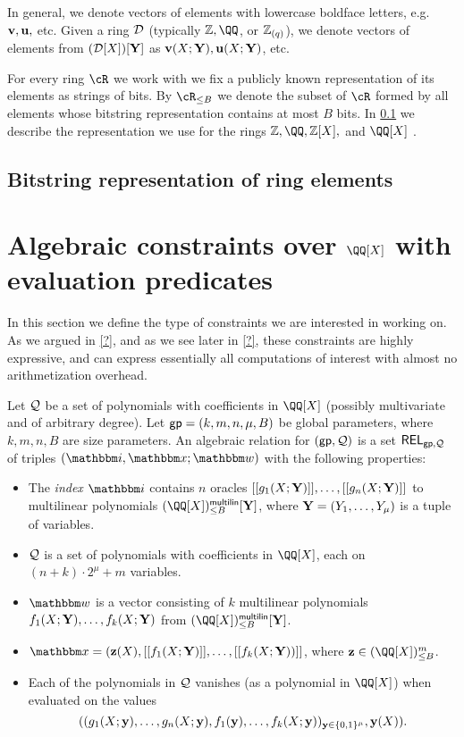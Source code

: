 \documentclass[11pt,letterpaper,usenames,dvipsnames]{article}
\begin{document}
In general, we denote vectors of elements with lowercase boldface letters, e.g.\ $\mathbf{v},\mathbf{u},$ etc. Given a ring $\mathcal{D}$ (typically $\ZZ, \QQ$, or $\mathbb{Z}_{(q)}$), we denote vectors of elements from $(\mathcal{D}[X])[\mathbf{Y}]$ as $\mathbf{v}(X;\mathbf{Y}), \mathbf{u}(X;\mathbf{Y})$, etc.


For every ring $\cR$ we work with we fix a publicly known representation of its elements as strings of bits. By $\cR_{\leq B}$ we denote the subset of $\cR$ formed by all elements whose bitstring representation contains at most $B$ bits. In \cref{s: bistring_reps} we describe the representation we use for the rings $\ZZ,\QQ, \ZZ[X],$ and $\QQ[X]$ .

\subsection{Bitstring representation of ring elements}\label{s: bistring_reps}

\section{Algebraic constraints over $\QQ[X]$ with evaluation predicates}

In this section we define the type of constraints we are interested in working on. As we argued in \cref{?}, and as we see later in \cref{?}, these constraints are highly expressive, and can  express essentially all computations of interest with almost no arithmetization overhead.


Let $\mathcal{Q}$ be a set of polynomials with coefficients in $\QQ[X]$ (possibly multivariate and of arbitrary degree). Let $\mathsf{gp} = (k, m, n, \mu, B)$ be global parameters, where $k,m,n,B$ are size parameters. An algebraic relation for $(\mathsf{gp},\mathcal{Q})$ is a set $\mathsf{REL}_{\mathsf{gp}, \mathcal{Q}}$ of triples $(\idx, \inp;\wit)$ with the following properties:
\begin{itemize}
	\item The \emph{index} $\idx$ contains $n$ oracles $[[{g_1(X;\mathbf{Y})}]], \ldots, [[{g_n(X;\mathbf{Y})}]]$ to multilinear polynomials $(\QQ[X])_{\leq B}^\multilin[\YY]$, where $\mathbf{Y}=(Y_1,\ldots, Y_\mu) $ is a tuple of variables.
	 \item $\mathcal{Q}$ is a set of polynomials with coefficients in $\QQ[X]$, each on $(n+ k)\cdot 2^\mu + m$ variables.
	\item $\wit$ is a vector consisting of $k$ multilinear polynomials $f_1(X;\mathbf{Y}),\ldots, f_k(X;\mathbf{Y})$ from $(\QQ[X])_{\leq B}^{\multilin}[\YY]$. %
	\item $\inp=(\zz(X), \oracle{f_1(X;\YY)}, \ldots, \oracle{f_k(X;\YY))}$, where $\zz\in (\QQ[X])_{\leq B}^m$.
	\item Each of the polynomials in $\mathcal{Q}$ vanishes (as a polynomial in $\QQ[X]$) when evaluated on the values $$((g_1(X;\mathbf{y}),\ldots, g_n(X;\mathbf{y}), f_1(\mathbf{y}),\ldots, f_k(X;\mathbf{y}))_{\mathbf{y}\in \{0,1\}^\mu}, \mathbf{y}(X)).$$ 
	\end{itemize}
\end{document}
